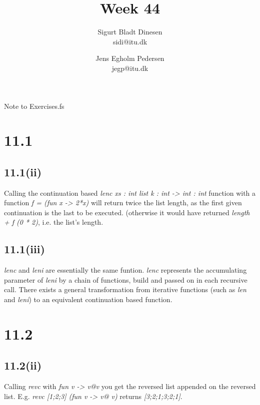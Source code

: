 \documentclass[a4paper, titlepage]{article}
\begin{document}
\title{Week 44}
\author{Sigurt Bladt Dinesen \\sidi@itu.dk 
  \and Jens Egholm Pedersen \\jegp@itu.dk}
\maketitle

Note to  Exercises.fs
\section*{11.1}
\subsection*{11.1(ii)}
Calling the continuation based \emph{lenc xs : int list k : int -> int : int}
function with a function \emph{f = (fun x -> 2*x)} will return twice the list
length, as the first given continuation is the last to be executed. (otherwise
it would have returned \emph{length + f (0 * 2)}, i.e. the list's length.

\subsection*{11.1(iii)}
\emph{lenc} and \emph{leni} are essentially the same funtion. \emph{lenc}
represents the accumulating parameter of \emph{leni} by a chain of functions,
build and passed on in each recursive call. There exists a general
transformation from iterative functions (such as \emph{len} and \emph{leni}) to
an equivalent continuation based function.

\section*{11.2}
\subsection*{11.2(ii)}
Calling \emph{revc} with \emph{fun v -> v@v} you get the reversed list appended
on the reversed list. E.g. \emph{revc [1;2;3] (fun v -> v@ v)} returns
\emph{[3;2;1;3;2;1]}.
\end{document}
